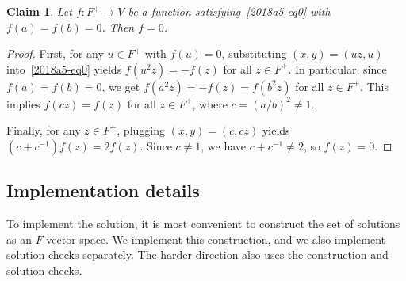 \documentclass{article}
\newtheorem*{claim}{Claim}
\begin{document}
\begin{claim}
Let $f : F^+ \to V$ be a function satisfying~\eqref{2018a5-eq0} with $f(a) = f(b) = 0$.
Then $f = 0$.
\end{claim}
\begin{proof}
First, for any $u \in F^+$ with $f(u) = 0$, substituting $(x, y) = (uz, u)$ into~\eqref{2018a5-eq0} yields $f(u^2 z) = -f(z)$ for all $z \in F^+$.
In particular, since $f(a) = f(b) = 0$, we get $f(a^2 z) = -f(z) = f(b^2 z)$ for all $z \in F^+$.
This implies $f(cz) = f(z)$ for all $z \in F^+$, where $c = (a/b)^2 \neq 1$.

Finally, for any $z \in F^+$, plugging $(x, y) = (c, cz)$ yields $(c + c^{-1}) f(z) = 2 f(z)$.
Since $c \neq 1$, we have $c + c^{-1} \neq 2$, so $f(z) = 0$.
\end{proof}



\subsection*{Implementation details}

To implement the solution, it is most convenient to construct the set of solutions as an $F$-vector space.
We implement this construction, and we also implement solution checks separately.
The harder direction also uses the construction and solution checks.
\end{document}
